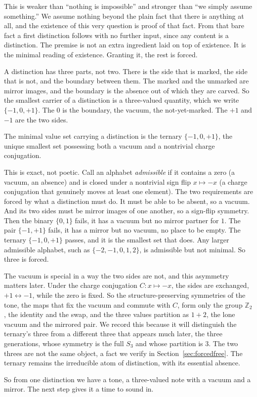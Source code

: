 This is weaker than ``nothing is impossible'' and stronger than ``we simply assume something.'' We assume nothing
beyond the plain fact that there is anything at all, and the existence of this very question is proof of that fact.
From that bare fact a first distinction follows with no further input, since any content is a distinction. The premise
is not an extra ingredient laid on top of existence. It is the minimal reading of existence. Granting it, the rest is
forced.

A distinction has three parts, not two. There is the side that is marked, the side that is not, and the boundary
between them. The marked and the unmarked are mirror images, and the boundary is the absence out of which they are
carved. So the smallest carrier of a distinction is a three-valued quantity, which we write $\{-1, 0, +1\}$. The $0$
is the boundary, the vacuum, the not-yet-marked. The $+1$ and $-1$ are the two sides.

\begin{principle}
The minimal value set carrying a distinction is the ternary $\{-1, 0, +1\}$, the unique smallest set possessing both
a vacuum and a nontrivial charge conjugation.
\end{principle}

This is exact, not poetic. Call an alphabet \emph{admissible} if it contains a zero (a vacuum, an absence) and is
closed under a nontrivial sign flip $x \mapsto -x$ (a charge conjugation that genuinely moves at least one element).
The two requirements are forced by what a distinction must do. It must be able to be absent, so a vacuum. And its two
sides must be mirror images of one another, so a sign-flip symmetry. Then the binary $\{0, 1\}$ fails, it has a vacuum
but no mirror partner for $1$. The pair $\{-1, +1\}$ fails, it has a mirror but no vacuum, no place to be empty. The
ternary $\{-1, 0, +1\}$ passes, and it is the smallest set that does. Any larger admissible alphabet, such as
$\{-2,-1,0,1,2\}$, is admissible but not minimal. So three is forced.

The vacuum is special in a way the two sides are not, and this asymmetry matters later. Under the charge conjugation
$C \colon x \mapsto -x$, the sides are exchanged, $+1 \leftrightarrow -1$, while the zero is fixed. So the
structure-preserving symmetries of the tone, the maps that fix the vacuum and commute with $C$, form only the group
$\mathbb{Z}_2$, the identity and the swap, and the three values partition as $1 + 2$, the lone vacuum and the mirrored
pair. We record this because it will distinguish the ternary's three from a different three that appears much later,
the three generations, whose symmetry is the full $S_3$ and whose partition is $3$. The two threes are not the same
object, a fact we verify in Section~\ref{sec:forcedfree}. The ternary remains the irreducible atom of distinction,
with its essential absence.

So from one distinction we have a tone, a three-valued note with a vacuum and a mirror. The next step gives it a time
to sound in.
